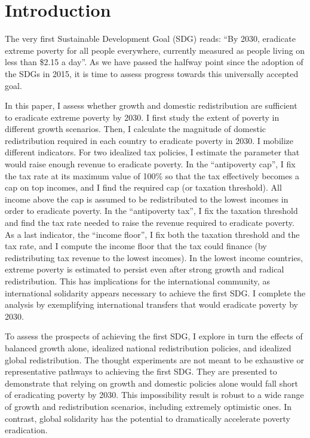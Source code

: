 
\section{Introduction}%

The very first Sustainable Development Goal (SDG) %
reads: ``By 2030, eradicate extreme poverty for all people everywhere, currently measured as people living on less than \$2.15 a day''. As we have passed the halfway point since the adoption of the SDGs in 2015, it is time to assess progress towards this universally accepted goal. 

In this paper, I assess whether growth and domestic redistribution are sufficient to eradicate extreme poverty by 2030. I first study the extent of poverty in different growth scenarios. Then, I calculate the magnitude of domestic redistribution required in each country to eradicate poverty in 2030. I mobilize different indicators. For two idealized tax policies, I estimate the parameter that would raise enough revenue to eradicate poverty. In the ``antipoverty cap'', I fix the tax rate at its maximum value of 100\% so that the tax effectively becomes a cap on top incomes, and I find the required cap (or taxation threshold). All income above the cap is assumed to be redistributed to the lowest incomes in order to eradicate poverty. In the ``antipoverty tax'', I fix the taxation threshold and find the tax rate needed to raise the revenue required to eradicate poverty. As a last indicator, the ``income floor'', I fix both the taxation threshold and the tax rate, and I compute the income floor that the tax could finance (by redistributing tax revenue to the lowest incomes). In the lowest income countries, extreme poverty is estimated to persist even after strong growth and radical redistribution. %
This has implications for the international community, as international solidarity appears necessary to achieve the first SDG. I complete the analysis by exemplifying international transfers that would eradicate poverty by 2030.

To assess the prospects of achieving the first SDG, I explore in turn the effects of balanced growth alone, idealized national redistribution policies, and idealized global redistribution. The thought experiments are not meant to be exhaustive or representative pathways to achieving the first SDG. They are presented to demonstrate that relying on growth and domestic policies alone would fall short of eradicating poverty by 2030. This impossibility result is robust to a wide range of growth and redistribution scenarios, including extremely optimistic ones. In contrast, global solidarity has the potential to dramatically accelerate poverty eradication.

